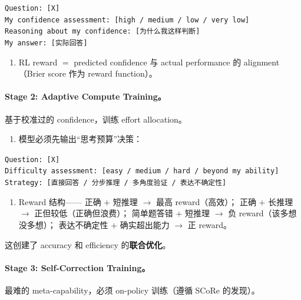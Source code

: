 \documentclass[12pt,a4paper]{article}
\begin{document}
\begin{tcolorbox}[colback=gray!5,colframe=gray!50,boxrule=0.3pt,left=4pt,right=4pt]
\small
\texttt{Question: [X]}\\[2pt]
\texttt{My confidence assessment: [high / medium / low / very low]}\\[2pt]
\texttt{Reasoning about my confidence: [为什么我这样判断]}\\[2pt]
\texttt{My answer: [实际回答]}
\end{tcolorbox}

\begin{enumerate}[leftmargin=2em,start=5]
  \item RL reward $=$ predicted confidence 与 actual performance 的
    alignment（Brier score 作为 reward function）。
\end{enumerate}

\paragraph{Stage 2: Adaptive Compute Training。}
基于校准过的 confidence，训练 effort allocation。

\begin{enumerate}[leftmargin=2em]
  \item 模型必须先输出``思考预算''决策：
\end{enumerate}

\begin{tcolorbox}[colback=gray!5,colframe=gray!50,boxrule=0.3pt,left=4pt,right=4pt]
\small
\texttt{Question: [X]}\\[2pt]
\texttt{Difficulty assessment: [easy / medium / hard / beyond my ability]}\\[2pt]
\texttt{Strategy: [直接回答 / 分步推理 / 多角度验证 / 表达不确定性]}
\end{tcolorbox}

\begin{enumerate}[leftmargin=2em,start=2]
  \item Reward 结构——
    正确 $+$ 短推理 $\rightarrow$ 最高 reward（高效）；
    正确 $+$ 长推理 $\rightarrow$ 正但较低（正确但浪费）；
    简单题答错 $+$ 短推理 $\rightarrow$ 负 reward（该多想没多想）；
    表达不确定性 $+$ 确实超出能力 $\rightarrow$ 正 reward。
\end{enumerate}

\noindent
这创建了 accuracy 和 efficiency 的\textbf{联合优化}。

\paragraph{Stage 3: Self-Correction Training。}
最难的 meta-capability，必须 on-policy 训练（遵循 SCoRe 的发现）。
\end{document}
